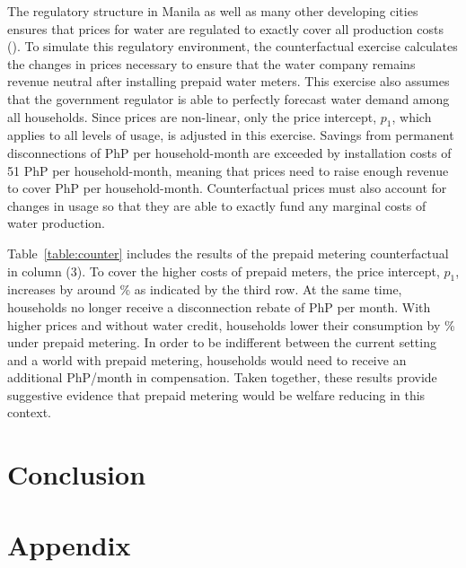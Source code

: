 \documentclass[12pt]{article}
\begin{document}
The regulatory structure in Manila as well as many other developing cities ensures that prices for water are regulated to exactly cover all production costs (\cite{hoque2013state}).  To simulate this regulatory environment, the counterfactual exercise calculates the changes in prices necessary to ensure that the water company remains revenue neutral after installing prepaid water meters.  This exercise also assumes that the government regulator is able to perfectly forecast water demand among all households.  Since prices are non-linear, only the price intercept, $p_1$, which applies to all levels of usage, is adjusted in this exercise.  Savings from permanent disconnections of PhP per household-month are exceeded by installation costs of 51 PhP per household-month, meaning that prices need to raise enough revenue to cover PhP per household-month.  Counterfactual prices must also account for changes in usage so that they are able to exactly fund any marginal costs of water production.

Table~\ref{table:counter} includes the results of the prepaid metering counterfactual in column (3).  To cover the higher costs of prepaid meters, the price intercept, $p_1$, increases by around \unskip\% as indicated by the third row.  At the same time, households no longer receive a disconnection rebate of PhP per month.  With higher prices and without water credit, households lower their consumption by \unskip\% under prepaid metering.  In order to be indifferent between the current setting and a world with prepaid metering, households would need to receive an additional PhP/month in compensation.  Taken together, these results provide suggestive evidence that prepaid metering would be welfare reducing in this context.


\section{Conclusion}







\pagebreak

\section{Appendix}
\end{document}
